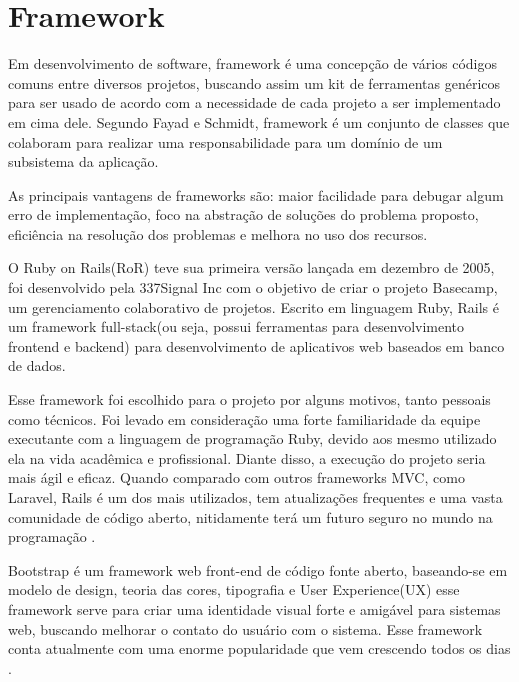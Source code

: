 \section{Framework}
Em desenvolvimento de software, framework é uma concepção de vários códigos comuns entre diversos projetos, buscando assim um kit de ferramentas genéricos para ser usado de acordo com a necessidade de cada projeto a ser implementado em cima dele. Segundo Fayad e Schmidt, framework é um conjunto de classes que colaboram para realizar uma responsabilidade para um domínio de um subsistema da aplicação\cite{frameworkwikipedia}. \par
As principais vantagens de frameworks são: maior facilidade para debugar algum erro de implementação, foco na abstração de soluções do problema proposto, eficiência na resolução dos problemas e melhora no uso dos recursos\cite{frameworkwikipedia}. \par
O Ruby on Rails(RoR) teve sua primeira versão lançada em dezembro de 2005, foi desenvolvido pela 337Signal Inc com o objetivo de criar o projeto Basecamp, um gerenciamento colaborativo de projetos. Escrito em linguagem Ruby, Rails é um framework full-stack(ou seja, possui ferramentas para desenvolvimento frontend e backend) para desenvolvimento de aplicativos web baseados em banco de dados\cite{plekhanova2009evaluating}. \par
Esse framework foi escolhido para o projeto por alguns motivos, tanto pessoais como técnicos. Foi levado em consideração uma forte familiaridade da equipe executante com a linguagem de programação Ruby, devido aos mesmo utilizado ela na vida acadêmica e profissional. Diante disso, a execução do projeto seria mais ágil e eficaz. Quando comparado com outros frameworks MVC, como Laravel, Rails é um dos mais utilizados, tem atualizações frequentes e uma vasta comunidade de código aberto, nitidamente terá um futuro seguro no mundo na programação \cite{verma2014mvc}. \par
Bootstrap é um framework web front-end de código fonte aberto, baseando-se em modelo de design, teoria das cores, tipografia e User Experience(UX) esse framework serve para criar uma identidade visual forte e amigável para sistemas web, buscando melhorar o contato do usuário com o sistema\cite{bootstrapwikipedia}. Esse framework conta atualmente com uma enorme popularidade que vem crescendo todos os dias \cite{jain2014review}. \par


